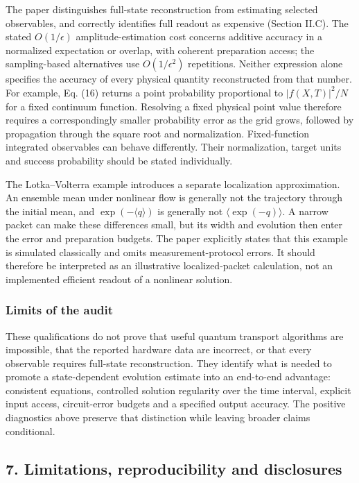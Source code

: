 The paper distinguishes full-state reconstruction from estimating
selected observables, and correctly identifies full readout as expensive
(Section II.C). The stated \(O(1/\epsilon)\) amplitude-estimation cost
concerns additive accuracy in a normalized expectation or overlap, with
coherent preparation access; the sampling-based alternatives use
\(O(1/\epsilon^2)\) repetitions. Neither expression alone specifies the
accuracy of every physical quantity reconstructed from that number. For
example, Eq. (16) returns a point probability proportional to
\(|f(X,T)|^2/N\) for a fixed continuum function. Resolving a fixed
physical point value therefore requires a correspondingly smaller
probability error as the grid grows, followed by propagation through the
square root and normalization. Fixed-function integrated observables can
behave differently. Their normalization, target units and success
probability should be stated individually.

The Lotka--Volterra example introduces a separate localization
approximation. An ensemble mean under nonlinear flow is generally not
the trajectory through the initial mean, and \(\exp(-\langle q\rangle)\)
is generally not \(\langle\exp(-q)\rangle\). A narrow packet can make
these differences small, but its width and evolution then enter the
error and preparation budgets. The paper explicitly states that this
example is simulated classically and omits measurement-protocol errors.
It should therefore be interpreted as an illustrative localized-packet
calculation, not an implemented efficient readout of a nonlinear
solution.

\subsubsection{Limits of the audit}\label{limits-of-the-audit}

These qualifications do not prove that useful quantum transport
algorithms are impossible, that the reported hardware data are
incorrect, or that every observable requires full-state reconstruction.
They identify what is needed to promote a state-dependent evolution
estimate into an end-to-end advantage: consistent equations, controlled
solution regularity over the time interval, explicit input access,
circuit-error budgets and a specified output accuracy. The positive
diagnostics above preserve that distinction while leaving broader claims
conditional.

\subsection{7. Limitations, reproducibility and
disclosures}\label{limitations-reproducibility-and-disclosures}

